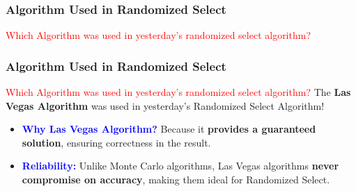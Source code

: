 \begin{frame}
    \frametitle{Algorithm Used in Randomized Select}
    \vspace{0.4cm} %
     \textcolor{red}{Which Algorithm was used in yesterday's randomized select algorithm?}
    
    \vspace{0.5cm} %
\end{frame}


\begin{frame}
    \frametitle{Algorithm Used in Randomized Select}
    \vspace{0.4cm} %

    \begin{block}{\textcolor{red}{Which Algorithm was used in yesterday's randomized select algorithm?}}
        The \textbf{Las Vegas Algorithm} was used in yesterday’s Randomized Select Algorithm!
    \end{block}
    \vspace{0.4cm} %

    \begin{itemize}
        \item \textbf{\textcolor{blue}{Why Las Vegas Algorithm?}} 
        Because it \textbf{provides a guaranteed solution}, ensuring correctness in the result.
        \vspace{0.3cm} %
        
        \item \textbf{\textcolor{blue}{Reliability:}} 
        Unlike Monte Carlo algorithms, Las Vegas algorithms \textbf{never compromise on accuracy}, making them ideal for Randomized Select.
    \end{itemize}
    
    \vspace{0.5cm} %
\end{frame}


